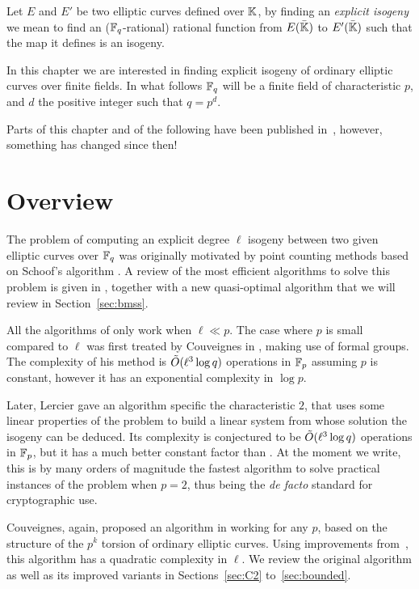 Let $E$ and $E'$ be two elliptic curves defined over $\mathbb{K}$, by finding
an \emph{explicit isogeny} we mean to find an ($\mathbb{F}_q$-rational)
rational function from $E(\bar{\mathbb{K}})$ to $E'(\bar{\mathbb{K}})$ such that the
map it defines is an isogeny. 

In this chapter we are interested in finding explicit isogeny of
ordinary elliptic curves over finite fields. In what follows $\mathbb{F}_q$
will be a finite field of characteristic $p$, and $d$ the positive
integer such that $q=p^d$.

Parts of this chapter and of the following have been published
in~\cite{df10}, however, something has changed since then!


\section{Overview}
\label{sec:history}

The problem of computing an explicit degree $\ell$ isogeny between two
given elliptic curves over $\mathbb{F}_q$ was originally motivated by point
counting methods based on Schoof's algorithm
\cite{atkin88,elkies92,elkies98,schoof95}. A review of the most
efficient algorithms to solve this problem is given in
\cite{bostan+morain+salvy+schost08}, together with a new quasi-optimal
algorithm that we will review in Section~\ref{sec:bmss}.

All the algorithms of \cite{bostan+morain+salvy+schost08} only work
when $\ell\ll p$. The case where $p$ is small compared to $\ell$ was
first treated by Couveignes in \cite{couveignes94}, making use of
formal groups. The complexity of his method is $\tilde{O}(\ell^3\log q)$ operations in
$\mathbb{F}_p$ assuming $p$ is constant, however it has an exponential
complexity in $\log p$.

Later, Lercier \cite{lercier96} gave an algorithm specific the
characteristic $2$, that uses some linear properties of the problem to
build a linear system from whose solution the isogeny can be
deduced. Its complexity is conjectured to be $\tilde{O}(\ell^3\log q)$
operations in $\mathbb{F}_p$, but it has a much better constant factor than
\cite{couveignes94}. At the moment we write, this is by many orders of
magnitude the fastest algorithm to solve practical instances of the
problem when $p=2$, thus being the \emph{de facto} standard for
cryptographic use.

Couveignes, again, proposed an algorithm in \cite{couveignes96}
working for any $p$, based on the structure of the $p^k$ torsion of
ordinary elliptic curves. Using improvements
from~\cite{couveignes00,df+schost09,df10}, this algorithm has a
quadratic complexity in $\ell$. We review the original algorithm as
well as its improved variants in Sections~\ref{sec:C2}
to~\ref{sec:bounded}.

